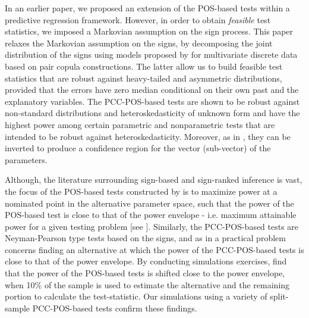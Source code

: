 \documentclass[harvard,11pt]{article}
\begin{document}
In an earlier paper, we proposed an extension of the POS-based tests within a predictive regression framework. However, in order to obtain \textit{feasible} test statistics, we imposed a Markovian assumption on the sign process. This paper relaxes the Markovian assumption on the signs, by decomposing the joint distribution of the signs using models proposed by \citet{panagiotelis2012pair} for multivariate discrete data based on pair copula constructions. The latter allow us to build feasible test statistics that are robust against heavy-tailed and asymmetric distributions, provided that the errors have zero median conditional on their own past and the explanatory variables. The PCC-POS-based tests are shown to be robust against non-standard distributions and heteroskedasticity of unknown form and have the highest power among certain parametric and nonparametric tests that are intended to be robust against heteroskedasticity. Moreover, as in \citet{dufour2010exact}, they can be inverted to produce a confidence region for the vector (sub-vector) of the parameters.  

Although, the literature surrounding sign-based and sign-ranked inference is vast, the focus of the POS-based tests constructed by \citet{dufour2010exact} is to maximize power at a nominated point in the alternative parameter space, such that the power of the POS-based test is close to that of the power envelope - i.e. maximum attainable power for a given testing problem [see \citet{king1987towards}]. Similarly, the PCC-POS-based tests are Neyman-Pearson type tests based on the signs, and as in \citet{dufour2010exact} a practical problem concerns finding an alternative at which the power of the PCC-POS-based tests is close to that of the power envelope. By conducting simulations exercises, \citet{dufour2010exact} find that the power of the POS-based tests is shifted close to the power envelope, when 10\% of the sample is used to estimate the alternative and the remaining portion to calculate the test-statistic. Our simulations using a variety of split-sample PCC-POS-based tests confirm these findings.
\end{document}
